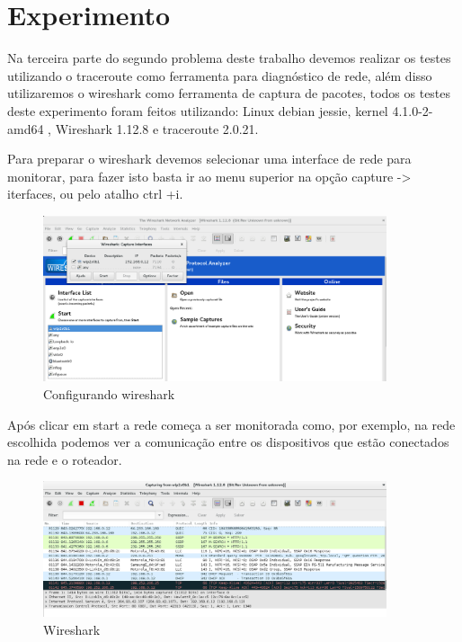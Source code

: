 \section{Experimento}

Na terceira parte do segundo problema deste trabalho devemos realizar os testes
utilizando o traceroute como ferramenta para diagnóstico de rede,
além disso utilizaremos o wireshark como ferramenta de captura de pacotes,
todos os testes deste experimento foram feitos utilizando: Linux debian jessie, kernel 4.1.0-2-amd64
, Wireshark 1.12.8 e  traceroute 2.0.21.

Para preparar o wireshark devemos selecionar uma interface de rede para monitorar,
para fazer isto basta ir ao menu superior na opção capture -> iterfaces, ou
pelo atalho ctrl +i.

\begin{figure}[h]
  \centering
  \includegraphics[width=0.9\textwidth]{figuras/f1.eps}
  \caption{Configurando wireshark}
  \label{fig:f1}
\end{figure}

Após clicar em start a rede começa a ser monitorada como, por exemplo,
na rede escolhida podemos ver a comunicação entre os dispositivos que estão
conectados na rede e o roteador.

\begin{figure}[h]
  \centering
  \includegraphics[width=0.9\textwidth]{figuras/f2.eps}
  \caption{Wireshark}
  \label{fig:f2}
\end{figure}


